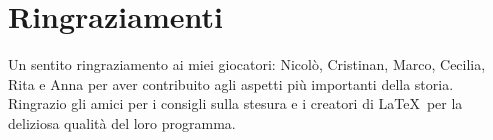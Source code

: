 
\begingroup
\let\clearpage\relax
\let\cleardoublepage\relax
\let\cleardoublepage\relax

\chapter*{Ringraziamenti}
Un sentito ringraziamento ai miei giocatori: Nicol\`o, Cristinan, Marco, Cecilia, Rita e Anna per aver contribuito agli aspetti pi\`u importanti della storia. Ringrazio gli amici per i consigli sulla stesura e i creatori di \LaTeX\ per la deliziosa qualit\`a del loro programma.
\endgroup




